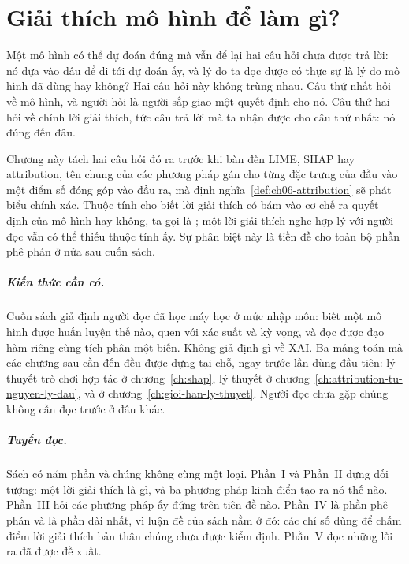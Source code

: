 \chapter{Giải thích mô hình để làm gì?}
\label{ch:giai-thich-de-lam-gi}

Một mô hình có thể dự đoán đúng mà vẫn để lại hai câu hỏi chưa được trả lời:
nó dựa vào đâu để đi tới dự đoán ấy, và lý do ta đọc được có thực sự là lý do
mô hình đã dùng hay không? Hai câu hỏi này không trùng nhau. Câu thứ nhất hỏi
về mô hình, và người hỏi là người sắp giao một quyết định cho nó. Câu thứ hai
hỏi về chính lời giải thích, tức câu trả lời mà ta nhận được cho câu thứ nhất:
nó đúng đến đâu.

Chương này tách hai câu hỏi đó ra trước khi bàn đến LIME, SHAP hay attribution,
tên chung của các phương pháp gán cho từng đặc trưng của đầu vào một điểm số
đóng góp vào đầu ra, mà định nghĩa~\ref{def:ch06-attribution} sẽ phát biểu
chính xác.
Thuộc tính cho biết lời giải thích có bám vào cơ chế ra quyết định của mô hình
hay không, ta gọi là ; một lời giải thích nghe
hợp lý với người đọc vẫn có thể thiếu thuộc tính ấy. Sự phân biệt này là tiền
đề cho toàn bộ phần phê phán ở nửa sau cuốn sách.

\paragraph{Kiến thức cần có.}
Cuốn sách giả định người đọc đã học máy học ở mức nhập môn: biết một mô hình
được huấn luyện thế nào, quen với xác suất và kỳ vọng, và đọc được đạo hàm
riêng cùng tích phân một biến. Không giả định gì về XAI. Ba mảng toán mà các
chương sau cần đến đều được dựng tại chỗ, ngay trước lần dùng đầu tiên: lý
thuyết trò chơi hợp tác ở chương~\ref{ch:shap}, lý thuyết  ở
chương~\ref{ch:attribution-tu-nguyen-ly-dau}, và  ở
chương~\ref{ch:gioi-han-ly-thuyet}. Người đọc chưa gặp chúng không cần đọc
trước ở đâu khác.

\paragraph{Tuyến đọc.}
Sách có năm phần và chúng không cùng một loại. Phần~I và Phần~II dựng đối
tượng: một lời giải thích là gì, và ba phương pháp kinh điển tạo ra nó thế nào.
Phần~III hỏi các phương pháp ấy đứng trên tiên đề nào. Phần~IV là phần phê
phán và là phần dài nhất, vì luận đề của sách nằm ở đó: các chỉ số dùng để chấm
điểm lời giải thích bản thân chúng chưa được kiểm định. Phần~V đọc những lối ra
đã được đề xuất.

